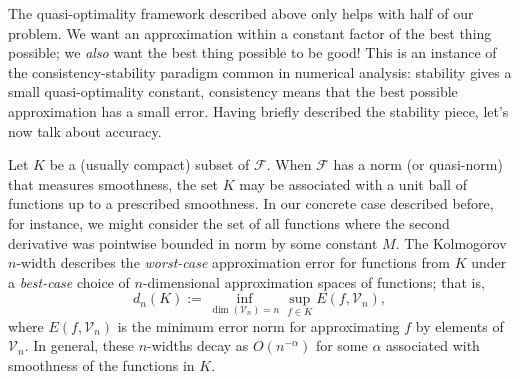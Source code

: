 \documentclass[12pt, leqno]{article} %
\begin{document}
The quasi-optimality framework described above only helps with half of
our problem.  We want an approximation within a constant factor of the
best thing possible; we {\em also} want the best thing possible to be
good!  This is an instance of the consistency-stability paradigm
common in numerical analysis: stability gives a small
quasi-optimality constant, consistency means that the best possible
approximation has a small error.  Having briefly described the
stability piece, let's now talk about accuracy.

Let $K$ be a (usually compact) subset of $\mathcal{F}$.  When
$\mathcal{F}$ has a norm (or quasi-norm) that measures smoothness,
the set $K$ may be associated with a unit ball of functions up to a
prescribed smoothness.  In our concrete case described before, for
instance, we might consider the set of all functions where the second
derivative was pointwise bounded in norm by some constant $M$.  The
Kolmogorov $n$-width describes the {\em worst-case} approximation
error for functions from $K$ under a {\em best-case} choice of
$n$-dimensional approximation spaces of functions; that is,
\[
  d_n(K) := \inf_{\dim(\mathcal{V}_n) = n} \sup_{f \in K} E(f, \mathcal{V}_n),
\]
where $E(f, \mathcal{V}_n)$ is the minimum error norm for
approximating $f$ by elements of $\mathcal{V}_n$.  In general, these
$n$-widths decay as $O(n^{-\alpha})$ for some $\alpha$ associated with
smoothness of the functions in $K$.
\end{document}
